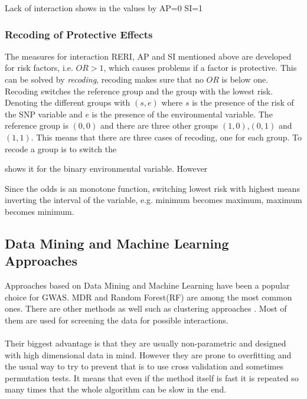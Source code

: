 \documentclass[10pt,a4paper]{report}
\begin{document}
Lack of interaction shows in the values by \cite{recoding_2011}
AP=0
SI=1

\subsubsection{Recoding of Protective Effects}
\label{recode}
The measures for interaction RERI, AP and SI mentioned above are developed for risk factors, i.e. $OR>1$, which causes problems if a factor is protective\cite{recoding_2011}. This can be solved by \emph{recoding}, recoding makes sure that no $OR$ is below one\cite{recoding_2011}. Recoding switches the reference group and the group with the lowest risk\cite{recoding_2011}. Denoting the different groups with $(s,e)$ where $s$ is the presence of the risk of the SNP variable and $e$ is the presence of the environmental variable. The reference group is $(0,0)$ and there are three other groups $(1,0)$,$(0,1)$ and $(1,1)$. This means that there are three cases of recoding, one for each group. To recode a group is to switch the 

\cite{recoding_2011} shows it for the binary environmental variable. However 

Since the odds is an monotone function, switching lowest risk with highest means inverting the interval of the variable, e.g. minimum becomes maximum, maximum becomes minimum.

\subsection{Data Mining and Machine Learning Approaches}
\label{data_machine_learning}
Approaches based on Data Mining and Machine Learning have been a popular choice for GWAS. MDR\cite{mdr_2001} and Random Forest(RF)\cite{random_forest} are among the most common ones\cite{gene_enviroment_2013,cordell_detect_review}. There are other methods as well such as clustering approaches \cite{fast_high_order_cluster}. Most of them are used for screening the data for possible interactions\cite{gene_enviroment_2013,cordell_detect_review}.\\
\\
Their biggest advantage is that they are usually non-parametric and designed with high dimensional data in mind. However they are prone to overfitting and the usual way to try to prevent that is to use cross validation and sometimes permutation tests. It means that even if the method itself is fast it is repeated so many times that the whole algorithm can be slow in the end.\cite{cordell_detect_review}
\end{document}
